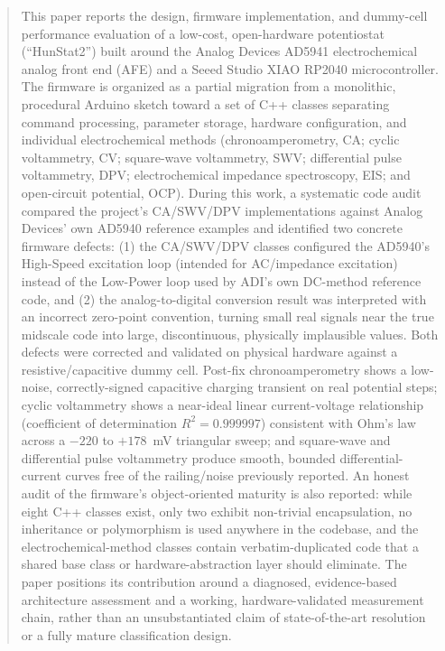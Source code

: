\documentclass[preprint,12pt]{elsarticle}
\begin{document}
\begin{frontmatter}
\begin{abstract}
This paper reports the design, firmware implementation, and dummy-cell performance evaluation of a low-cost, open-hardware potentiostat (``HunStat2'') built around the Analog Devices AD5941 electrochemical analog front end (AFE) and a Seeed Studio XIAO RP2040 microcontroller. The firmware is organized as a partial migration from a monolithic, procedural Arduino sketch toward a set of C++ classes separating command processing, parameter storage, hardware configuration, and individual electrochemical methods (chronoamperometry, CA; cyclic voltammetry, CV; square-wave voltammetry, SWV; differential pulse voltammetry, DPV; electrochemical impedance spectroscopy, EIS; and open-circuit potential, OCP). During this work, a systematic code audit compared the project's CA/SWV/DPV implementations against Analog Devices' own AD5940 reference examples and identified two concrete firmware defects: (1) the CA/SWV/DPV classes configured the AD5940's High-Speed excitation loop (intended for AC/impedance excitation) instead of the Low-Power loop used by ADI's own DC-method reference code, and (2) the analog-to-digital conversion result was interpreted with an incorrect zero-point convention, turning small real signals near the true midscale code into large, discontinuous, physically implausible values. Both defects were corrected and validated on physical hardware against a resistive/capacitive dummy cell. Post-fix chronoamperometry shows a low-noise, correctly-signed capacitive charging transient on real potential steps; cyclic voltammetry shows a near-ideal linear current-voltage relationship (coefficient of determination $R^2 = 0.999997$) consistent with Ohm's law across a $-220$ to $+178$~mV triangular sweep; and square-wave and differential pulse voltammetry produce smooth, bounded differential-current curves free of the railing/noise previously reported. An honest audit of the firmware's object-oriented maturity is also reported: while eight C++ classes exist, only two exhibit non-trivial encapsulation, no inheritance or polymorphism is used anywhere in the codebase, and the electrochemical-method classes contain verbatim-duplicated code that a shared base class or hardware-abstraction layer should eliminate. The paper positions its contribution around a diagnosed, evidence-based architecture assessment and a working, hardware-validated measurement chain, rather than an unsubstantiated claim of state-of-the-art resolution or a fully mature classification  design.
\end{abstract}


\end{frontmatter}
\end{document}

